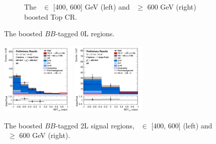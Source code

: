\begin{figure}[h!]
\begin{subfigure}[b]{\textwidth}
        \caption{The \ptv\ $\in$ [400, 600] GeV (left) and \ptv\ $\geq$ 600 GeV (right) boosted Top CR.}
        \label{fig:plots_VHbbBoost_1L_topCR}
    \end{subfigure}
    \caption{The boosted $BB$-tagged 0L regions.}
    \label{fig:plots_VHbbBoost_1L}
\end{figure} 

\vspace*{\fill}

\begin{figure}[h!]
    \centering
    \includegraphics[width=0.32\textwidth]{Images/VH/Own_fit/postfit_VHbb/Region_distmva_BMax600_BMin400_incFat1_Fat1_DSR_J0_TTypebb_incJet1_T2_L2_Y6051_GlobalFit_conditionnal_mu1.png}
    \includegraphics[width=0.32\textwidth]{Images/VH/Own_fit/postfit_VHbb/Region_distmva_BMin600_incFat1_Fat1_DSR_J0_TTypebb_incJet1_T2_L2_Y6051_GlobalFit_conditionnal_mu1.png}
    \caption{The boosted $BB$-tagged 2L signal regions, \ptv\ $\in$ [400, 600] (left) and \ptv\ $\geq$ 600 GeV (right).}
    \label{fig:plots_VHbbBoost_2L_SR}
\end{figure} 
